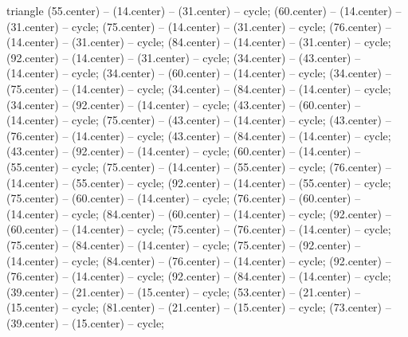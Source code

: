 {\begin{pgfonlayer}{triangle}
 (55.center) -- (14.center) -- (31.center) -- cycle; 
 (60.center) -- (14.center) -- (31.center) -- cycle; 
 (75.center) -- (14.center) -- (31.center) -- cycle; 
 (76.center) -- (14.center) -- (31.center) -- cycle; 
 (84.center) -- (14.center) -- (31.center) -- cycle; 
 (92.center) -- (14.center) -- (31.center) -- cycle; 
 (34.center) -- (43.center) -- (14.center) -- cycle; 
 (34.center) -- (60.center) -- (14.center) -- cycle; 
 (34.center) -- (75.center) -- (14.center) -- cycle; 
 (34.center) -- (84.center) -- (14.center) -- cycle; 
 (34.center) -- (92.center) -- (14.center) -- cycle; 
 (43.center) -- (60.center) -- (14.center) -- cycle; 
 (75.center) -- (43.center) -- (14.center) -- cycle; 
 (43.center) -- (76.center) -- (14.center) -- cycle; 
 (43.center) -- (84.center) -- (14.center) -- cycle; 
 (43.center) -- (92.center) -- (14.center) -- cycle; 
 (60.center) -- (14.center) -- (55.center) -- cycle; 
 (75.center) -- (14.center) -- (55.center) -- cycle; 
 (76.center) -- (14.center) -- (55.center) -- cycle; 
 (92.center) -- (14.center) -- (55.center) -- cycle; 
 (75.center) -- (60.center) -- (14.center) -- cycle; 
 (76.center) -- (60.center) -- (14.center) -- cycle; 
 (84.center) -- (60.center) -- (14.center) -- cycle; 
 (92.center) -- (60.center) -- (14.center) -- cycle; 
 (75.center) -- (76.center) -- (14.center) -- cycle; 
 (75.center) -- (84.center) -- (14.center) -- cycle; 
 (75.center) -- (92.center) -- (14.center) -- cycle; 
 (84.center) -- (76.center) -- (14.center) -- cycle; 
 (92.center) -- (76.center) -- (14.center) -- cycle; 
 (92.center) -- (84.center) -- (14.center) -- cycle; 
 (39.center) -- (21.center) -- (15.center) -- cycle; 
 (53.center) -- (21.center) -- (15.center) -- cycle; 
 (81.center) -- (21.center) -- (15.center) -- cycle; 
 (73.center) -- (39.center) -- (15.center) -- cycle; 

\end{pgfonlayer}}
